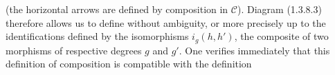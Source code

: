 (the horizontal arrows are defined by composition in $\mathcal C$).
Diagram (1.3.8.3) therefore allows us to define without ambiguity, or
more precisely up to the identifications defined by the isomorphisms
$i_g(h,h')$, the composite of two morphisms of respective degrees $g$
and $g'$. One verifies immediately that this definition of composition
is compatible with the definition
